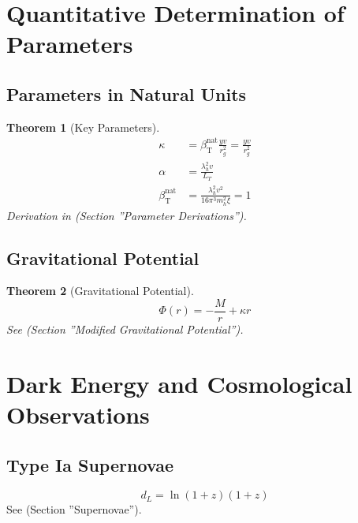 \documentclass[a4paper,12pt]{article}
\newtheorem{theorem}{Theorem}[section]
\theoremstyle{definition}
\theoremstyle{remark}
\newcommand{\betaT}{\beta_{\text{T}}}
\begin{document}
	\section{Quantitative Determination of Parameters}
	
	\subsection{Parameters in Natural Units}
	
	\begin{theorem}[Key Parameters]
		\begin{align}
			\kappa &= \betaT^{\text{nat}} \frac{y v}{r_g^2} = \frac{y v}{r_g^2} \\
			\alpha &= \frac{\lambda_h^2 v}{L_T} \\
			\betaT^{\text{nat}} &= \frac{\lambda_h^2 v^2}{16\pi^3 m_h^2 \xi} = 1
		\end{align}
		Derivation in \cite{pascher_params_2025} (Section ''Parameter Derivations'').
	\end{theorem}
	
	\subsection{Gravitational Potential}
	
	\begin{theorem}[Gravitational Potential]
		\begin{equation}
			\Phi(r) = -\frac{M}{r} + \kappa r
		\end{equation}
		See \cite{pascher_galaxies_2025} (Section ''Modified Gravitational Potential'').
	\end{theorem}
	
	\section{Dark Energy and Cosmological Observations}
	
	\subsection{Type Ia Supernovae}
	
	\begin{equation}
		d_L = \ln(1+z) (1+z)
	\end{equation}
	See \cite{pascher_messdifferenzen_2025} (Section ''Supernovae'').
	
\end{document}
